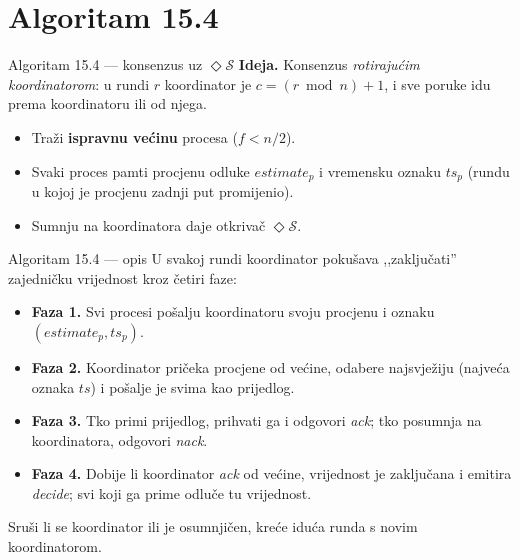 \documentclass[aspectratio=169,11pt]{beamer}
\newcommand{\eS}{\ensuremath{\Diamond\mathcal{S}}}
\begin{document}

\section{Algoritam 15.4}

\begin{frame}{Algoritam 15.4 --- konsenzus uz \eS}
  \textbf{Ideja.} Konsenzus \emph{rotirajućim koordinatorom}: u rundi $r$
  koordinator je $c=(r \bmod n)+1$, i sve poruke idu prema koordinatoru ili od
  njega.
  \begin{itemize}
    \item Traži \textbf{ispravnu većinu} procesa ($f < n/2$).
    \item Svaki proces pamti procjenu odluke $estimate_p$ i vremensku oznaku
      $ts_p$ (rundu u kojoj je procjenu zadnji put promijenio).
    \item Sumnju na koordinatora daje otkrivač \eS.
  \end{itemize}
\end{frame}

\begin{frame}{Algoritam 15.4 --- opis}
  U svakoj rundi koordinator pokušava ,,zaključati'' zajedničku vrijednost kroz
  četiri faze:
  \begin{itemize}
    \item \textbf{Faza 1.} Svi procesi pošalju koordinatoru svoju procjenu i
      oznaku $(estimate_p, ts_p)$.
    \item \textbf{Faza 2.} Koordinator pričeka procjene od većine, odabere
      najsvježiju (najveća oznaka $ts$) i pošalje je svima kao prijedlog.
    \item \textbf{Faza 3.} Tko primi prijedlog, prihvati ga i odgovori
      \emph{ack}; tko posumnja na koordinatora, odgovori \emph{nack}.
    \item \textbf{Faza 4.} Dobije li koordinator \emph{ack} od većine, vrijednost
      je zaključana i emitira \emph{decide}; svi koji ga prime odluče tu
      vrijednost.
  \end{itemize}
  \vfill
  \footnotesize Sruši li se koordinator ili je osumnjičen, kreće iduća runda s
  novim koordinatorom.
\end{frame}
\end{document}
